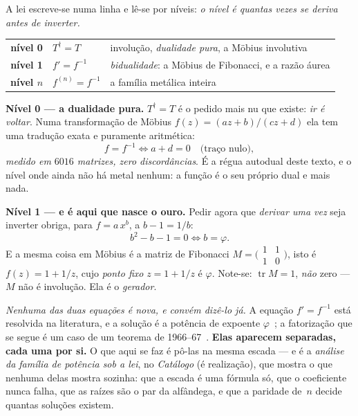 \documentclass[livro.tex]{subfiles}
\begin{document}
A lei escreve-se numa linha e lê-se por níveis: \emph{o nível é quantas vezes se deriva antes de
inverter.}

\begin{mdframed}[linewidth=0.4pt,innerleftmargin=10pt,innerrightmargin=10pt,
                 innertopmargin=8pt,innerbottommargin=8pt,skipabove=6pt,skipbelow=6pt]
\begin{center}
\begin{tabular}{@{}c@{\quad}l@{\quad}l@{}}
\textbf{nível 0} & $T^{\dagger}=T$ & involução, \emph{dualidade pura}, a Möbius involutiva \\[2pt]
\textbf{nível 1} & $f'=f^{-1}$     & \emph{bidualidade}: a Möbius de Fibonacci, e a razão áurea \\[2pt]
\textbf{nível $n$} & $f^{(n)}=f^{-1}$ & a família metálica inteira \\
\end{tabular}
\end{center}
\end{mdframed}

\medskip
\noindent \textbf{Nível 0 --- a dualidade pura.} $T^{\dagger}=T$ é o pedido mais nu que existe: \emph{ir
é voltar}. Numa transformação de Möbius $f(z)=(az+b)/(cz+d)$ ela tem uma tradução exata e
puramente aritmética:
\[
  f=f^{-1} \iff a+d=0 \quad\text{(traço nulo)} ,
\]
\emph{medido em $6016$ matrizes, zero discordâncias}. É a régua autodual deste texto, e o nível
onde ainda não há metal nenhum: a função é o seu próprio dual e mais nada.

\medskip
\noindent \textbf{Nível 1 --- e é aqui que nasce o ouro.} Pedir agora que \emph{derivar uma vez}
seja inverter obriga, para $f=a\,x^{b}$, a $b-1=1/b$:
\[
  b^{2}-b-1=0 \iff b=\varphi .
\]
E a mesma coisa em Möbius é a matriz de Fibonacci $M=\bigl(\begin{smallmatrix}1&1\\1&0\end{smallmatrix}\bigr)$,
isto é $f(z)=1+1/z$, cujo \emph{ponto fixo} $z=1+1/z$ é $\varphi$. Note-se: $\operatorname{tr}M=1$,
\emph{não} zero --- $M$ não é involução. Ela é o \emph{gerador}.

\medskip
\noindent\emph{Nenhuma das duas equações é nova, e convém dizê-lo já.} A equação $f'=f^{-1}$ está
resolvida na literatura, e a solução é a potência de expoente $\varphi$~\cite{cook2021}; a
fatorização que se segue é um caso de um teorema de 1966--67~\cite{wonenburger1966,djokovic1967}.
\textbf{Elas aparecem separadas, cada uma por si.} O que aqui se faz é pô-las na mesma escada
--- e é a \emph{análise da família de potência sob a lei}, no \emph{Catálogo} (é realização), que mostra o
que nenhuma delas mostra sozinha: que a escada é uma fórmula só, que o coeficiente nunca falha,
que as raízes são o par da alfândega, e que a paridade de~$n$ decide quantas soluções existem.
\end{document}
